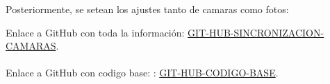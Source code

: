 \documentclass{article}
\begin{document}
Posteriormente, se setean los ajustes tanto de camaras como fotos:




























\noindent Enlace a GitHub con toda la información: \href{https://github.com/LukasWolff2002/SINCRONIZACION_CAMARAS_BASLER}{GIT-HUB-SINCRONIZACION-CAMARAS}.
\\ \\
\noindent Enlace a GitHub con codigo base: : \href{https://github.com/basler/pypylon/blob/master/samples/grabmultiplecameras.py}{GIT-HUB-CODIGO-BASE}.
\end{document}

